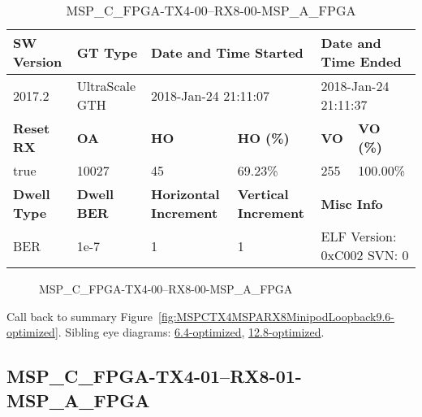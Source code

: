 \begin{table}[h]
\centering
\caption{MSP\_C\_FPGA-TX4-00--RX8-00-MSP\_A\_FPGA}
\label{tab:MSPCFPGATX400RX800MSPAFPGA9.6-optimized}
\begin{tabular}{@{}|l|l|l|l|l|l|@{}}
\toprule
\textbf{SW Version}                & \textbf{GT Type}   & \multicolumn{2}{l|}{\textbf{Date and Time Started}}            & \multicolumn{2}{l|}{\textbf{Date and Time Ended}}        \\ \midrule
2017.2                       & UltraScale GTH          & \multicolumn{2}{l|}{2018-Jan-24 21:11:07}                   & \multicolumn{2}{l|}{2018-Jan-24 21:11:37}               \\ \midrule
\textbf{Reset RX}                  & \textbf{OA} & \textbf{HO}   & \textbf{HO (\%)} & \textbf{VO} & \textbf{VO (\%)} \\ \midrule
true & 10027        & 45          & 69.23\%        & 255        & 100.00\%       \\ \midrule
\textbf{Dwell Type}                & \textbf{Dwell BER} & \textbf{Horizontal Increment} & \textbf{Vertical Increment}    & \multicolumn{2}{l|}{\textbf{Misc Info}}                  \\ \midrule
BER                            & 1e-7        & 1        & 1           & \multicolumn{2}{l|}{ELF Version: 0xC002 SVN: 0}                         \\ \bottomrule
\end{tabular}
\end{table}

\begin{figure}[h]
\caption{MSP\_C\_FPGA-TX4-00--RX8-00-MSP\_A\_FPGA} \label{fig:MSPCFPGATX400RX800MSPAFPGA9.6-optimized}
\end{figure}

Call back to summary Figure~\ref{fig:MSPCTX4MSPARX8MinipodLoopback9.6-optimized}.
Sibling eye diagrams: \hyperref[sec:MSPCFPGATX400RX800MSPAFPGA6.4-optimized]{6.4-optimized}, \hyperref[sec:MSPCFPGATX400RX800MSPAFPGA12.8-optimized]{12.8-optimized}.

\clearpage
\newpage


\subsection{MSP\_C\_FPGA-TX4-01--RX8-01-MSP\_A\_FPGA}\label{sec:MSPCFPGATX401RX801MSPAFPGA9.6-optimized}

